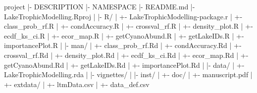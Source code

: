 \documentclass[
  letterpaper,
  chapter,a4paper,showtrims,openright,hidelinks]{oblivoir}
\newenvironment{Shaded}{\begin{snugshade}}{\end{snugshade}}
\newcommand{\ErrorTok}[1]{\textcolor[rgb]{0.68,0.00,0.00}{#1}}
\newcommand{\NormalTok}[1]{\textcolor[rgb]{0.00,0.23,0.31}{#1}}
\newcommand{\SpecialCharTok}[1]{\textcolor[rgb]{0.37,0.37,0.37}{#1}}
\begin{document}
\begin{Shaded}
\begin{Highlighting}[]
\NormalTok{project}
\SpecialCharTok{|{-}}\NormalTok{ DESCRIPTION}
\SpecialCharTok{|{-}}\NormalTok{ NAMESPACE}
\SpecialCharTok{|{-}}\NormalTok{ README.md}
\SpecialCharTok{|{-}}\NormalTok{ LakeTrophicModelling.Rproj}
\SpecialCharTok{|}
\ErrorTok{|}\SpecialCharTok{{-}}\NormalTok{ R}\SpecialCharTok{/}
\ErrorTok{|}   \SpecialCharTok{+{-}}\NormalTok{ LakeTrophicModelling}\SpecialCharTok{{-}}\NormalTok{package.r}
\SpecialCharTok{|}   \SpecialCharTok{+{-}}\NormalTok{ class\_prob\_rf.R}
\SpecialCharTok{|}   \SpecialCharTok{+{-}}\NormalTok{ condAccuracy.R}
\SpecialCharTok{|}   \SpecialCharTok{+{-}}\NormalTok{ crossval\_rf.R}
\SpecialCharTok{|}   \SpecialCharTok{+{-}}\NormalTok{ density\_plot.R}
\SpecialCharTok{|}   \SpecialCharTok{+{-}}\NormalTok{ ecdf\_ks\_ci.R}
\SpecialCharTok{|}   \SpecialCharTok{+{-}}\NormalTok{ ecor\_map.R}
\SpecialCharTok{|}   \SpecialCharTok{+{-}}\NormalTok{ getCyanoAbund.R}
\SpecialCharTok{|}   \SpecialCharTok{+{-}}\NormalTok{ getLakeIDs.R}
\SpecialCharTok{|}   \SpecialCharTok{+{-}}\NormalTok{ importancePlot.R}
\SpecialCharTok{|}
\ErrorTok{|}\SpecialCharTok{{-}}\NormalTok{ man}\SpecialCharTok{/}
\ErrorTok{|}   \SpecialCharTok{+{-}}\NormalTok{ class\_prob\_rf.Rd}
\SpecialCharTok{|}   \SpecialCharTok{+{-}}\NormalTok{ condAccuracy.Rd}
\SpecialCharTok{|}   \SpecialCharTok{+{-}}\NormalTok{ crossval\_rf.Rd}
\SpecialCharTok{|}   \SpecialCharTok{+{-}}\NormalTok{ density\_plot.Rd}
\SpecialCharTok{|}   \SpecialCharTok{+{-}}\NormalTok{ ecdf\_ks\_ci.Rd}
\SpecialCharTok{|}   \SpecialCharTok{+{-}}\NormalTok{ ecor\_map.Rd}
\SpecialCharTok{|}   \SpecialCharTok{+{-}}\NormalTok{ getCyanoAbund.Rd}
\SpecialCharTok{|}   \SpecialCharTok{+{-}}\NormalTok{ getLakeIDs.Rd}
\SpecialCharTok{|}   \SpecialCharTok{+{-}}\NormalTok{ importancePlot.Rd}
\SpecialCharTok{|}
\ErrorTok{|}\SpecialCharTok{{-}}\NormalTok{ data}\SpecialCharTok{/}                
\ErrorTok{|}   \SpecialCharTok{+{-}}\NormalTok{ LakeTrophicModelling.rda}
\SpecialCharTok{|}
\ErrorTok{|}\SpecialCharTok{{-}}\NormalTok{ vignettes}\SpecialCharTok{/}
\ErrorTok{|}
\ErrorTok{|}\SpecialCharTok{{-}}\NormalTok{ inst}\SpecialCharTok{/}
\ErrorTok{|}   \SpecialCharTok{+{-}}\NormalTok{ doc}\SpecialCharTok{/}
\ErrorTok{|}      \SpecialCharTok{+{-}}\NormalTok{ manuscript.pdf}
\SpecialCharTok{|}   \SpecialCharTok{+{-}}\NormalTok{ extdata}\SpecialCharTok{/}
\ErrorTok{|}      \SpecialCharTok{+{-}}\NormalTok{ ltmData.csv}
\SpecialCharTok{|}      \SpecialCharTok{+{-}}\NormalTok{ data\_def.csv}
\end{Highlighting}
\end{Shaded}
\end{document}
